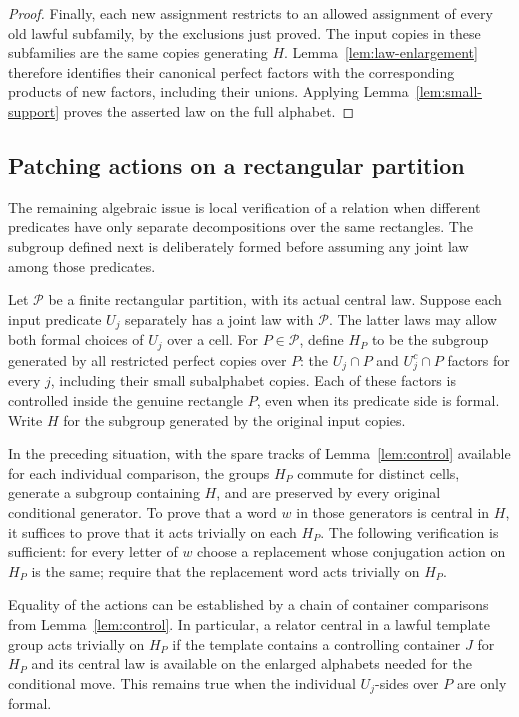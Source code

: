 \begin{proof}
Finally, each new assignment restricts to an allowed assignment of
every old lawful subfamily, by the exclusions just proved. The input
copies in these subfamilies are the same copies generating $H$.
Lemma~\ref{lem:law-enlargement} therefore identifies their canonical
perfect factors with the corresponding products of new factors,
including their unions. Applying
Lemma~\ref{lem:small-support} proves the asserted law on
the full alphabet.
\end{proof}

\subsection{Patching actions on a rectangular partition}

The remaining algebraic issue is local verification of a
relation when different predicates have only separate
decompositions over the same rectangles.  The subgroup
defined next is deliberately formed before assuming any
joint law among those predicates.

Let $\mathcal P$ be a finite rectangular partition, with
its actual central law.  Suppose each input predicate
$U_j$ separately has a joint law with $\mathcal P$.
The latter laws may allow both formal choices of $U_j$
over a cell.  For $P\in\mathcal P$, define $H_P$ to be
the subgroup generated by all restricted perfect copies
over $P$: the $U_j\cap P$ and $U_j^c\cap P$ factors for
every $j$, including their small subalphabet copies.
Each of these factors is controlled inside the genuine
rectangle $P$, even when its predicate side is formal.
Write $H$ for the subgroup generated by the original input copies.

\begin{lemma}
\label{lem:patching}
In the preceding situation, with the spare tracks of
Lemma~\ref{lem:control} available for each individual comparison,
the groups $H_P$ commute for
distinct cells, generate a subgroup containing $H$, and are
preserved by every original conditional generator.
To prove that a word $w$ in those generators is central
in $H$, it suffices to prove that it acts trivially on
each $H_P$.  The following verification is sufficient:
for every letter of $w$ choose a replacement whose
conjugation action on $H_P$ is the same; require that the
replacement word acts trivially on $H_P$.

Equality of the actions can be established by a chain
of container comparisons from Lemma~\ref{lem:control}.
In particular, a relator central in a lawful template
group acts trivially on $H_P$ if the template contains
a controlling container $J$ for $H_P$ and its central
law is available on the enlarged alphabets needed for
the conditional move.  This remains true when the
individual $U_j$-sides over $P$ are only formal.
\end{lemma}

